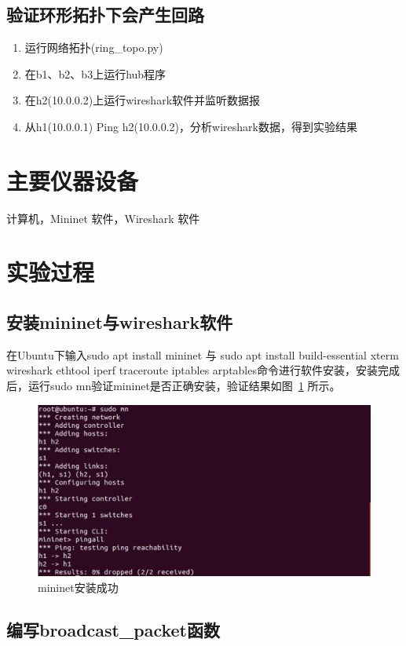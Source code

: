\documentclass{zjureport}
\begin{document}
  \subsection{验证环形拓扑下会产生回路}
    \begin{enumerate}
      \item 运行网络拓扑(ring\_topo.py)
      \item 在b1、b2、b3上运行hub程序
      \item 在h2(10.0.0.2)上运行wireshark软件并监听数据报
      \item 从h1(10.0.0.1) Ping h2(10.0.0.2)，分析wireshark数据，得到实验结果
    \end{enumerate}

\section{主要仪器设备}
  计算机，Mininet 软件，Wireshark 软件

\section{实验过程}
  \subsection{安装mininet与wireshark软件}
     在Ubuntu下输入sudo apt install mininet 与 sudo apt install build-essential xterm wireshark ethtool iperf traceroute iptables arptables命令进行软件安装，安装完成后，运行sudo mn验证mininet是否正确安装，验证结果如图~\ref{fig:install} 所示。
           \begin{figure}[!htbp]
               \centering
               \includegraphics[width=0.7\linewidth]{figures/02.jpg}
               \caption{mininet安装成功}
               \label{fig:install}
           \end{figure}

  \subsection{编写broadcast\_packet函数}
      
\end{document}
